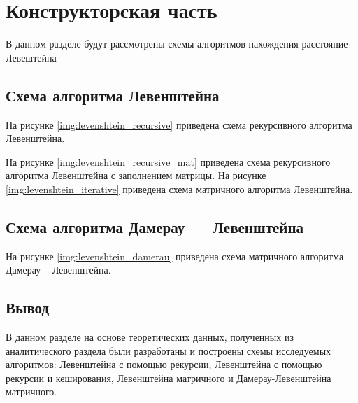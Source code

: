 \chapter{Конструкторская часть}
В данном разделе будут рассмотрены схемы алгоритмов нахождения расстояние Левештейна

\section{Схема алгоритма Левенштейна}

На рисунке \ref{img:levenshtein_recursive} приведена схема рекурсивного алгоритма Левенштейна.

\newpage
На рисунке \ref{img:levenshtein_recursive_mat} приведена схема рекурсивного алгоритма Левенштейна с заполнением матрицы.
\newpage
На рисунке \ref{img:levenshtein_iterative} приведена схема матричного алгоритма Левенштейна.
\newpage
\section{Схема алгоритма Дамерау — Левенштейна}

На рисунке \ref{img:levenshtein_damerau} приведена схема матричного алгоритма Дамерау -- Левенштейна.
\newpage

\section{Вывод}
В данном разделе на основе теоретических данных, полученных из аналитического раздела были разработаны и построены схемы исследуемых алгоритмов: Левенштейна с помощью рекурсии, Левенштейна с помощью рекурсии и кеширования, Левенштейна матричного и Дамерау-Левенштейна матричного.



